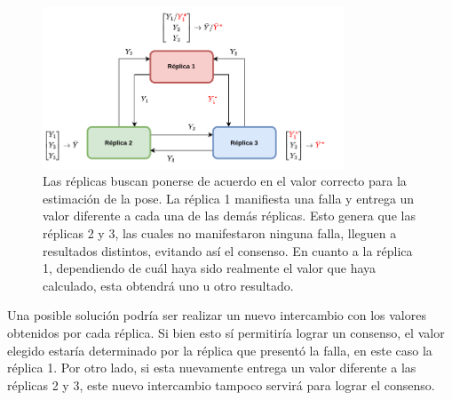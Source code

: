 \begin{figure}[H]
    \centering
    \includegraphics[width=0.8\textwidth]{img/TMR_sin_arbitro_consenso_falla.png}
    \caption{Las réplicas buscan ponerse de acuerdo en el valor correcto para la estimación de la pose. La réplica 1 manifiesta una falla y entrega un valor diferente a cada una de las demás réplicas. Esto genera que las réplicas 2 y 3, las cuales no manifestaron ninguna falla, lleguen a resultados distintos, evitando así el consenso. En cuanto a la réplica 1, dependiendo de cuál haya sido realmente el valor que haya calculado, esta obtendrá uno u otro resultado.}
    \label{fig:TMR_sin_arbitro_consenso_falla}
\end{figure}



Una posible solución podría ser realizar un nuevo intercambio con los valores obtenidos por cada réplica. Si bien esto sí permitiría lograr un consenso, el valor elegido estaría determinado por la réplica que presentó la falla, en este caso la réplica 1. Por otro lado, si esta nuevamente entrega un valor diferente a las réplicas 2 y 3, este nuevo intercambio tampoco servirá para lograr el consenso.

